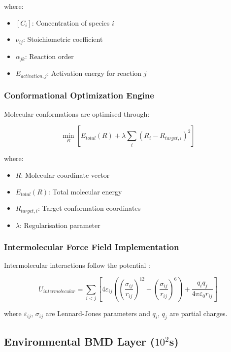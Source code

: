 \documentclass[12pt,a4paper]{article}
\begin{document}
where:
\begin{itemize}
\item $[C_i]$: Concentration of species $i$
\item $\nu_{ij}$: Stoichiometric coefficient
\item $\alpha_{jk}$: Reaction order
\item $E_{activation,j}$: Activation energy for reaction $j$
\end{itemize}

\subsubsection{Conformational Optimization Engine}

Molecular conformations are optimised through:

\begin{equation}
\min_{R} \left[ E_{total}(R) + \lambda \sum_i (R_i - R_{target,i})^2 \right]
\end{equation}

where:
\begin{itemize}
\item $R$: Molecular coordinate vector
\item $E_{total}(R)$: Total molecular energy
\item $R_{target,i}$: Target conformation coordinates
\item $\lambda$: Regularisation parameter
\end{itemize}

\subsubsection{Intermolecular Force Field Implementation}

Intermolecular interactions follow the potential \cite{stone2013theory}:

\begin{equation}
U_{intermolecular} = \sum_{i<j} \left[ 4\varepsilon_{ij} \left( \left(\frac{\sigma_{ij}}{r_{ij}}\right)^{12} - \left(\frac{\sigma_{ij}}{r_{ij}}\right)^6 \right) + \frac{q_i q_j}{4\pi\varepsilon_0 r_{ij}} \right]
\end{equation}

where $\varepsilon_{ij}$, $\sigma_{ij}$ are Lennard-Jones parameters and $q_i$, $q_j$ are partial charges.

\subsection{Environmental BMD Layer ($10^2$s)}
\end{document}
